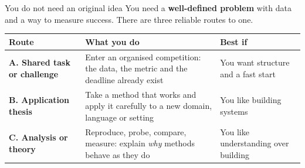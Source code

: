 \documentclass[aspectratio=169,11pt]{beamer}
\newcommand{\key}[1]{\textbf{\color{brand}#1}}
\begin{document}
\begin{frame}{You do not need an original idea}
You need a \key{well-defined problem} with data and a way to measure success.
There are three reliable routes to one.

\vspace{4mm}
\footnotesize
\begin{tabularx}{\textwidth}{>{\raggedright\arraybackslash}p{3.2cm} X >{\raggedright\arraybackslash}p{3.4cm}}
\toprule
\textbf{\color{brand}Route} & \textbf{\color{brand}What you do} & \textbf{\color{brand}Best if} \\
\midrule
\rowcolor{rowtint}
\textbf{A. Shared task or challenge} & Enter an organised competition: the
data, the metric and the deadline already exist & You want structure and a fast
start \\
\textbf{B. Application thesis} & Take a method that works and apply it
carefully to a new domain, language or setting & You like building systems \\
\rowcolor{rowtint}
\textbf{C. Analysis or theory} & Reproduce, probe, compare, measure: explain
\emph{why} methods behave as they do & You like understanding over building \\
\bottomrule
\end{tabularx}
\end{frame}
\end{document}
